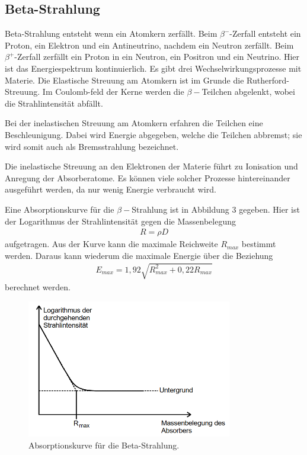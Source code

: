 \subsection{Beta-Strahlung}
Beta-Strahlung entsteht wenn ein Atomkern zerfällt. Beim $\beta^{-}$-Zerfall entsteht ein Proton, ein Elektron und ein Antineutrino, nachdem ein Neutron zerfällt.
Beim $\beta^{+}$-Zerfall zerfällt ein Proton in ein Neutron, ein Positron und ein Neutrino. 
Hier ist das Energiespektrum kontinuierlich.
Es gibt drei Wechselwirkungsprozesse mit Materie.
Die Elastische Streuung am Atomkern ist im Grunde die Rutherford-Streuung. Im Coulomb-feld der Kerne werden die $\beta-$Teilchen abgelenkt, wobei die Strahlintensität abfällt.

\noindent Bei der inelastischen Streuung am Atomkern erfahren die Teilchen eine Beschleunigung. Dabei wird Energie abgegeben, welche die Teilchen abbremst; sie wird somit auch als Bremsstrahlung bezeichnet.

\noindent Die inelastische Streuung an den Elektronen der Materie führt zu Ionisation und Anregung der Absorberatome. Es können viele solcher Prozesse hintereinander ausgeführt werden, da nur wenig Energie verbraucht wird. 

\noindent Eine Absorptionskurve für die $\beta-$Strahlung ist in Abbildung 3 gegeben. 
Hier ist der Logarithmus der Strahlintensität gegen die Massenbelegung 
\begin{align}
R = \rho D
\end{align} aufgetragen. Aus der Kurve kann die maximale Reichweite $R_{max}$ bestimmt werden.
Daraus kann wiederum die maximale Energie über die Beziehung
\begin{align}
  E_{max} = 1,92 \sqrt{R_{max}^2 + 0,22 R_{max}}
\end{align}
berechnet werden.
\begin{figure}[H]
  \centering
  \includegraphics[width=0.8\textwidth]{beta.png}
  \caption{Absorptionskurve für die Beta-Strahlung.\cite[S.12]{kent}}
  \label{fig:aufbau}
\end{figure}
